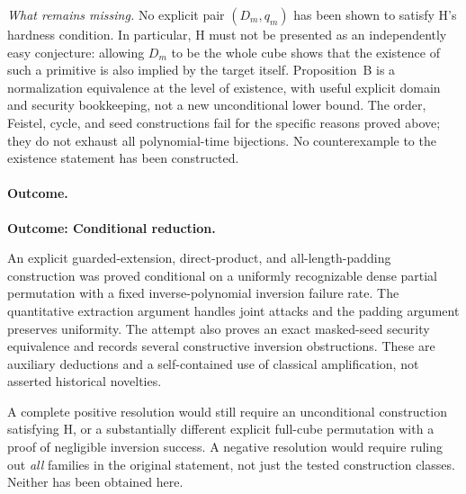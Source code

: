 \documentclass[11pt,a4paper]{article}
\numberwithin{equation}{section}
\begin{document}
\textit{What remains missing.}
No explicit pair $(D_m,q_m)$ has been shown to satisfy H's hardness
condition. In particular, H must not be presented as an independently
easy conjecture: allowing $D_m$ to be the whole cube shows that the
existence of such a primitive is also implied by the target itself.
Proposition~B is a normalization equivalence at the level of existence,
with useful explicit domain and security bookkeeping, not a new
unconditional lower bound. The order, Feistel, cycle, and seed
constructions fail for the specific reasons proved above; they do not
exhaust all polynomial-time bijections. No counterexample to the
existence statement has been constructed.

\paragraph{Outcome.}
\textbf{Outcome: Conditional reduction.}

An explicit guarded-extension, direct-product, and all-length-padding
construction was proved conditional on a uniformly recognizable dense
partial permutation with a fixed inverse-polynomial inversion failure
rate. The quantitative extraction argument handles joint attacks and
the padding argument preserves uniformity. The attempt also proves an
exact masked-seed security equivalence and records several constructive
inversion obstructions. These are auxiliary deductions and a
self-contained use of classical amplification, not asserted historical
novelties.

A complete positive resolution would still require an unconditional
construction satisfying H, or a substantially different explicit
full-cube permutation with a proof of negligible inversion success.
A negative resolution would require ruling out \emph{all} families in
the original statement, not just the tested construction classes. Neither
has been obtained here.
\end{document}
